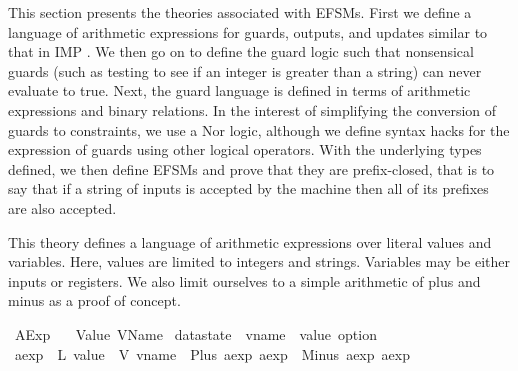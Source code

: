 %
\begin{isabellebody}%
%
%
\isadelimdocument
%
\endisadelimdocument
%
\isatagdocument
%
\isamarkuptrue%
%
\endisatagdocument
{\isafolddocument}%
%
\isadelimdocument
%
\endisadelimdocument
%
\begin{isamarkuptext}%
This section presents the theories associated with EFSMs. First we define a language of arithmetic
expressions for guards, outputs, and updates similar to that in IMP \cite{fixme}. We then go on to
define the guard logic such that nonsensical guards (such as testing to see if an integer is greater
than a string) can never evaluate to true. Next, the guard language is defined in terms of
arithmetic expressions and binary relations. In the interest of simplifying the conversion of guards
to constraints, we use a Nor logic, although we define syntax hacks for the expression of guards
using other logical operators. With the underlying types defined, we then define EFSMs and prove
that they are prefix-closed, that is to say that if a string of inputs is accepted by the machine
then all of its prefixes are also accepted.%
\end{isamarkuptext}\isamarkuptrue%
%
\isadelimdocument
%
\endisadelimdocument
%
\isatagdocument
%
\isamarkuptrue%
%
\endisatagdocument
{\isafolddocument}%
%
\isadelimdocument
%
\endisadelimdocument
%
\begin{isamarkuptext}%
This theory defines a language of arithmetic expressions over literal values and variables. Here,
values are limited to integers and strings. Variables may be either inputs or registers. We also
limit ourselves to a simple arithmetic of plus and minus as a proof of concept.%
\end{isamarkuptext}\isamarkuptrue%
%
\isadelimtheory
%
\endisadelimtheory
%
\isatagtheory
{}\isamarkupfalse%
\ AExp\isanewline
\ \ \ Value\ VName\isanewline
{}%
\endisatagtheory
{\isafoldtheory}%
%
\isadelimtheory
%
\endisadelimtheory
\isanewline
\isanewline
{}\isamarkupfalse%
\ datastate\ {\isacharequal}\ {\isachardoublequoteopen}vname\ {\isasymRightarrow}\ value\ option{\isachardoublequoteclose}\isanewline
\isanewline
{}\isamarkupfalse%
\ aexp\ {\isacharequal}\ L\ {\isachardoublequoteopen}value{\isachardoublequoteclose}\ {\isacharbar}\ V\ vname\ {\isacharbar}\ Plus\ aexp\ aexp\ {\isacharbar}\ Minus\ aexp\ aexp\isanewline

\end{isabellebody}
